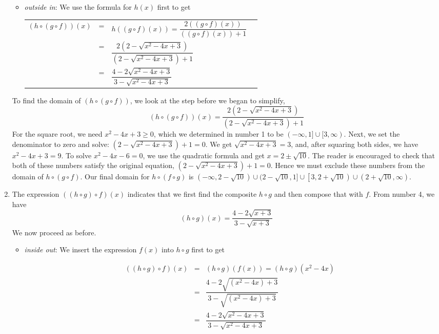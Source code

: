\begin{ex}
\begin{enumerate}
\begin{itemize}
\item  \textit{outside in}:  We use the formula for $h(x)$ first to get
\begin{longtable}{rclr} $(h \circ (g \circ f))(x)$ & = & $h((g \circ f)(x))=\dfrac{2 \left( (g \circ f)(x)\right)}{  \left( (g \circ f)(x)\right) + 1}$  & \\ [12pt]
& = & $\dfrac{2 \left(2 - \sqrt{x^2-4x+3}\right)}{\left(2 - \sqrt{x^2-4x+3}\right)+1}$ & \\ [12pt]
 & = & $\dfrac{4 - 2\sqrt{x^2-4x+3}}{3 - \sqrt{x^2-4x+3}}$ & \\
 \end{longtable}
 
 \end{itemize}
 
To find the domain of $(h \circ (g \circ f))$, we look at the step before we began to simplify, \[(h \circ (g \circ f))(x) = \frac{2 \left(2 - \sqrt{x^2-4x+3}\right)}{\left(2 - \sqrt{x^2-4x+3}\right)+1}\]  For the square root, we need $x^2-4x+3 \geq 0$, which we determined in number 1 to be $(-\infty, 1] \cup [3,\infty)$.  Next, we set the denominator to zero and solve:  $\left(2 - \sqrt{x^2-4x+3}\right)+1 = 0$.  We get $\sqrt{x^2-4x+3} = 3$, and, after squaring both sides, we have $x^2-4x+3 = 9$.  To solve $x^2-4x-6 = 0$, we use the quadratic formula and get $x = 2 \pm \sqrt{10}$.  The reader is encouraged to check that both of these numbers satisfy the original equation, $\left(2 - \sqrt{x^2-4x+3}\right)+1 = 0$.  Hence we must exclude these numbers from the domain of $h \circ (g \circ f)$.  Our final domain for $h \circ (f \circ g)$ is $(-\infty, 2 -\sqrt{10}) \cup (2 - \sqrt{10}, 1] \cup \left[3, 2 + \sqrt{10}\right) \cup \left(2+\sqrt{10}, \infty\right)$.

\item  The expression $((h \circ g) \circ f)(x)$ indicates that we first find the composite $h \circ g$ and then compose that with $f$.  From number 4, we have \[(h \circ g)(x) = \frac{4-2\sqrt{x+3}}{3-\sqrt{x+3}}\]  We now proceed as before.

\begin{itemize}

\item  \textit{inside out}: We insert the expression $f(x)$ into $h \circ g$ first to get 

\[ \begin{array}{rclr}
((h \circ g) \circ f)(x) & = & (h \circ g)(f(x)) = (h \circ g)\left(x^2-4x\right) & \\ [2pt]
                         & = & \dfrac{4-2\sqrt{\left(x^2-4x\right)+3}}{3-\sqrt{\left(x^2-4x\right)+3}} & \\ [12pt]
                         & = & \dfrac{4 - 2\sqrt{x^2-4x+3}}{3 - \sqrt{x^2-4x+3}} & \\ \end{array}\]


\end{itemize}
\end{enumerate}
\end{ex}
